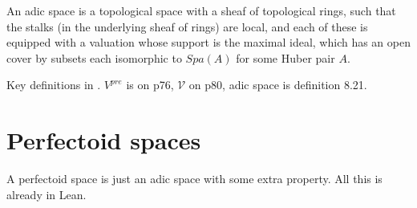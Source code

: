 \documentclass{amsart}
\theoremstyle{plain}
\theoremstyle{remark}
\begin{document}
An adic space is a topological space with a sheaf of topological rings, such that the stalks (in the underlying sheaf of rings) are local, and each of these is equipped with a valuation whose support is the maximal ideal, which has an open cover by subsets each isomorphic to $Spa(A)$ for some Huber pair $A$.

Key definitions in \cite{Wedhorn}. $V^{pre}$ is on p76, $\mathcal{V}$ on p80, adic space is definition 8.21.

\section{Perfectoid spaces}

A perfectoid space is just an adic space with some extra property. All this is already in Lean.
\end{document}
